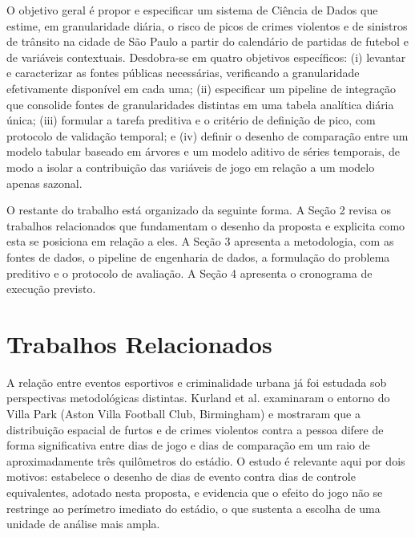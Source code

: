 \documentclass[12pt]{article}
\begin{document}
O objetivo geral é propor e especificar um sistema de Ciência de Dados que
estime, em granularidade diária, o risco de picos de crimes violentos e de
sinistros de trânsito na cidade de São Paulo a partir do calendário de partidas
de futebol e de variáveis contextuais. Desdobra-se em quatro objetivos
específicos: (i) levantar e caracterizar as fontes públicas necessárias,
verificando a granularidade efetivamente disponível em cada uma; (ii)
especificar um pipeline de integração que consolide fontes de granularidades
distintas em uma tabela analítica diária única; (iii) formular a tarefa
preditiva e o critério de definição de pico, com protocolo de validação
temporal; e (iv) definir o desenho de comparação entre um modelo tabular
baseado em árvores e um modelo aditivo de séries temporais, de modo a isolar a
contribuição das variáveis de jogo em relação a um modelo apenas sazonal.

O restante do trabalho está organizado da seguinte forma. A Seção 2 revisa os
trabalhos relacionados que fundamentam o desenho da proposta e explicita como
esta se posiciona em relação a eles. A Seção 3 apresenta a metodologia, com as
fontes de dados, o pipeline de engenharia de dados, a formulação do problema
preditivo e o protocolo de avaliação. A Seção 4 apresenta o cronograma de
execução previsto.

\section{Trabalhos Relacionados}

A relação entre eventos esportivos e criminalidade urbana já foi estudada sob
perspectivas metodológicas distintas. Kurland et al. \cite{kurland2014}
examinaram o entorno do Villa Park (Aston Villa Football Club, Birmingham) e
mostraram que a distribuição espacial de furtos e de crimes violentos contra a
pessoa difere de forma significativa entre dias de jogo e dias de comparação em
um raio de aproximadamente três quilômetros do estádio. O estudo é relevante
aqui por dois motivos: estabelece o desenho de dias de evento contra dias de
controle equivalentes, adotado nesta proposta, e evidencia que o efeito do jogo
não se restringe ao perímetro imediato do estádio, o que sustenta a escolha de
uma unidade de análise mais ampla.
\end{document}
